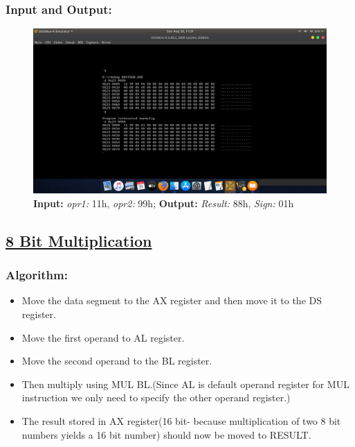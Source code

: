 \documentclass[12pt,a4paper]{article}
\begin{document}
\begin{flushleft}
\subsubsection*{\textbf{Input and Output:}}
\begin{figure}[h]
    \centering
    \includegraphics[trim = 100mm 70mm 100mm 80mm, clip, width = \textwidth]{Subtraction.png}
    \caption{ \textbf{Input:} \emph{opr1:} 11h, \emph{opr2:} 99h; 
              \textbf{Output:} \emph{Result:} 88h, \emph{Sign:} 01h}
\end{figure}


\newpage
\subsection*{\textbf{\underline{8 Bit Multiplication}}}

\subsubsection*{\textbf{Algorithm:}}
\begin{itemize}
    \item Move the data segment to the AX register and then move it to the DS register.
    \item Move the first operand to AL register.
\item  Move the second operand to the BL register.
\item  Then multiply using MUL BL.(Since AL is default operand register for MUL instruction we only need to specify the other operand register.)
\item  The result stored in AX register(16 bit- because multiplication of two 8 bit numbers yields a 16 bit number) should now be moved to
RESULT.
\end{itemize}


\end{flushleft}
\end{document}
